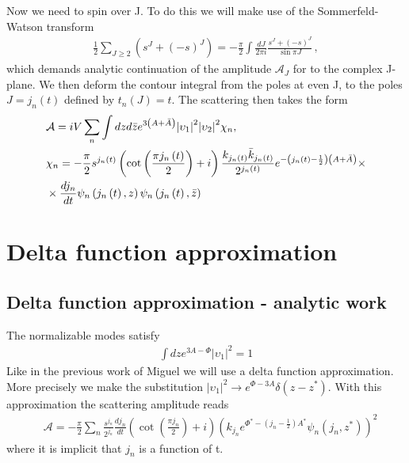 \documentclass[12pt,a4paper]{article}
\begin{document}
Now we need to spin over J. To do this we will make use of the Sommerfeld-Watson transform
\begin{align}
    \frac{1}{2} \sum_{J \geq 2} \left( s^J + {(- s)}^J \right)= - \frac{\pi}{2} \int \frac{dJ}{2 \pi i} \frac{s^J + {(- s)}^J}{\sin \pi J}\,,
\end{align}
which demands analytic continuation of the amplitude $\mathcal{A}_J$ for to the complex J-plane. We then deform the contour integral from the poles at even J, to the poles $J = j_n (t)$ defined by $t_n(J) = t$. The scattering then takes the form
\begin{align}
& \mathcal{A} = i V \sum_n \int dz d\bar{z} e^{3\left(A + \bar{A}\right)} {\left| \upsilon_1 \right|}^2 {\left| \upsilon_2 \right|}^2 \chi_n, \\ \notag
& \chi_n = - \frac{\pi}{2} s^{j_n \left(t\right)} \left( \cot\left(\frac{\pi j_n \left(t\right)}{2}\right) + i\right) \frac{k_{j_n \left(t\right)}\bar{k}_{j_n \left(t\right)}}{2^{j_n \left(t\right)}} e^{-\left( j_n \left(t\right) - \frac{1}{2} \right)\left(A+\bar{A}\right)} \times \\
& \times \frac{d j_n}{d t} \psi_n \left(j_n \left(t\right), z \right)  \psi_n \left(j_n \left(t\right), \bar{z} \right)
\end{align}

\section{Delta function approximation}

\subsection{Delta function approximation - analytic work}
The normalizable modes satisfy
\begin{align}
    \int dz e^{3 A - \Phi} {|\upsilon_1|}^2 = 1
\end{align}
Like in the previous work of Miguel we will use a delta function approximation.
More precisely we make the substitution ${|\upsilon_1|}^2 \rightarrow e^{\Phi - 3 A} \delta \left( z - z^{*} \right)$.
With this approximation the scattering amplitude reads
\begin{align}
    & \mathcal{A} = - \frac{\pi}{2} \sum_n \frac{s^{j_n}}{2^{j_n}} \frac{d j_n}{d t}\left( \cot\left(\frac{\pi j_n}{2}\right) + i\right) {\left(k_{j_n} e^{\Phi^{*}-\left( j_n - \frac{1}{2} \right)A^{*}} \psi_n \left(j_n, z^{*} \right)\right)}^2
\end{align}
where it is implicit that $j_n$ is a function of t.
\end{document}
